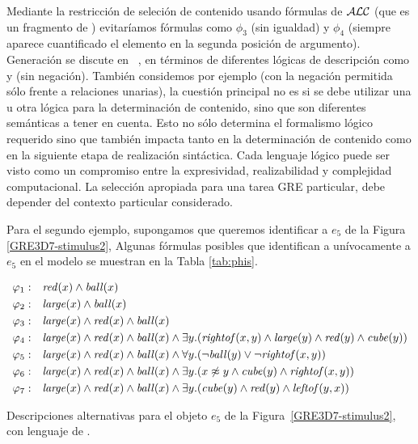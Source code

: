%
 Mediante la restricci\'on de seleci\'on de contenido usando f\'ormulas de $\mathcal{ALC}$ (que es un fragmento de \FOL)
evitar\'iamos f\'ormulas como $\phi_3$ (sin igualdad) y $\phi_4$ (siempre aparece cuantificado el elemento en la segunda posici\'on de argumento).
Generaci\'on se discute en ~\cite{areces08}, en t\'erminos de diferentes l\'ogicas de descripci\'on como \ALC
y \EL (\ALC sin negaci\'on). Tambi\'en considemos por ejemplo \ELAN (\ALC con la negaci\'on permitida s\'olo frente a relaciones unarias), la cuesti\'on principal no es si se debe utilizar una u otra l\'ogica para la determinaci\'on de contenido, sino que son diferentes sem\'anticas a tener en cuenta. Esto no s\'olo determina el formalismo l\'ogico requerido sino que tambi\'en impacta tanto en la determinaci\'on de contenido como en la siguiente etapa de realizaci\'on sint\'actica. Cada
lenguaje l\'ogico puede ser visto como un compromiso entre la expresividad, realizabilidad y complejidad computacional. La selecci\'on apropiada para una tarea GRE particular, debe depender del contexto particular considerado.

Para el segundo ejemplo, supongamos que queremos identificar a $e_5$ de la Figura \ref{GRE3D7-stimulus2}, Algunas f\'ormulas posibles que identifican a un\'ivocamente a $e_5$ en el modelo se muestran en la Tabla \ref{tab:phis}.

\begin{table}
$$
\begin{array}{cl}
 \varphi_1: & \mathit{red}(x) \land \mathit{ball}(x)\\[3pt]
 \varphi_2: & \mathit{large}(x) \land \mathit{ball}(x)\\[3pt]
 \varphi_3: & \mathit{large}(x) \land \mathit{red}(x) \land \mathit{ball}(x)\\[3pt]
 \varphi_4: & \mathit{large}(x) \land \mathit{red}(x) \land \mathit{ball}(x) \land
   \exists y . (\mathit{rightof}(x,y) \land \mathit{large}(y) \land \mathit{red}(y) \land \mathit{cube}(y))\\[3pt]
 \varphi_5: & \mathit{large}(x) \land \mathit{red}(x) \land \mathit{ball}(x) \land
  \forall y . (\neg \mathit{ball}(y) \lor \neg \mathit{rightof}(x,y))\\[3pt]
 \varphi_6: & \mathit{large}(x) \land \mathit{red}(x) \land \mathit{ball}(x) \land
  \exists y . (x \not\approx y \land \mathit{cube}(y) \land \mathit{rightof}(x,y))\\[3pt]
 \varphi_7: & \mathit{large}(x) \land \mathit{red}(x) \land \mathit{ball}(x) \land
  \exists y . (\mathit{cube}(y) \land \mathit{red}(y) \land \mathit{leftof}(y,x))
 \end{array}
$$
\caption{Descripciones alternativas para el objeto $e_5$ de la Figura~\ref{GRE3D7-stimulus2}, con lenguaje de \FOL.}\label{tab:phis}
\end{table}

